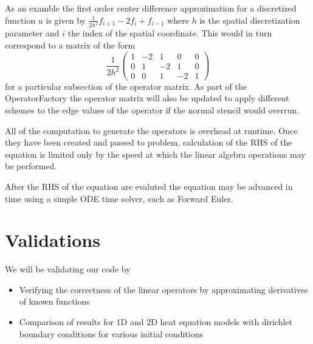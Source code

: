 \documentclass{article}
\begin{document}
		As an examble the first order center difference approximation for a discretized function $u$ is given by $\frac{1}{2h^2}f_{i+1} - 2 f_{i} + f_{i-1}$ where $h$ is the spatial discretization parameter and $i$ the index of the spatial coordinate. This would in turn correspond to a matrix of the form
		\begin{equation}
		\frac{1}{2 h^2} \left(
		\begin{matrix}
		1 & -2 & 1 & 0 & 0 \\
		0 & 1 & -2 & 1 & 0 \\
		0 & 0 & 1 & -2 & 1
		\end{matrix}\right)
		\end{equation}
		for a particular subsection of the operator matrix. As part of the OperatorFactory the operator matrix will also be updated to apply different schemes to the edge values of the operator if the normal stencil would overrun. 

		All of the computation to generate the operators is overhead at runtime. Once they have been created and passed to problem, calculation of the RHS of the equation is limited only by the speed at which the linear algebra operations may be performed.

		After the RHS of the equation are evaluted the equation may be advanced in time using a simple ODE time solver, such as Forward Euler. 

	\section{Validations}
		We will be validating our code by 
		\begin{itemize}
			\item Verifying the correctness of the linear operators by approximating derivatives of known functions
			\item Comparison of results for 1D and 2D heat equation models with dirichlet boundary conditions for various initial conditions
		\end{itemize}


	\nocite{pycfd}
	\nocite{*}
	\printbibliography
\end{document}

